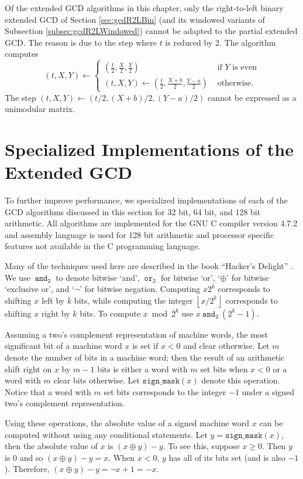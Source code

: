\documentclass{ucalgthes1}
\theoremstyle{definition}
\newcommand{\floor}[1]{\left\lfloor #1 \right\rfloor}
\newcommand{\band}{~\texttt{and}_\texttt{2}~}
\newcommand{\bor}{~\texttt{or}_\texttt{2}~}
\newcommand{\bxor}{\oplus}
\newcommand{\bnot}{\lnot}
\newcommand{\compiler}{GNU C compiler version 4.7.2}
\begin{document}
Of the extended GCD algorithms in this chapter, only the right-to-left binary extended GCD of Section \ref{sec:gcdR2LBin} (and its windowed variants of Subsection \ref{subsec:gcdR2LWindowed}) cannot be adapted to the partial extended GCD.  The reason is due to the step where $t$ is reduced by 2.  The algorithm computes
\[
	(t, X, Y) \gets \begin{cases}
		\left( \frac{t}{2}, \frac{X}{2}, \frac{Y}{2} \right) &
			\textrm{ if $Y$ is even} \\
		(t, X, Y) \gets \left( \frac{t}{2}, \frac{X+b}{2}, \frac{Y-a}{2} \right) & 
			\textrm{ otherwise.}
	\end{cases}
\]
The step $(t, X, Y) \gets (t/2, (X+b)/2, (Y-a)/2)$ cannot be expressed as a unimodular matrix.


\section{Specialized Implementations of the Extended GCD}
\label{sec:gcdImpl}

To further improve performance, we specialized implementations of each of the GCD algorithms discussed in this section for 32 bit, 64 bit, and 128 bit arithmetic.  All algorithms are implemented for the \compiler{} and assembly language is used for 128 bit arithmetic and processor specific features not available in the C programming language.

Many of the techniques used here are described in the book ``Hacker's Delight'' \cite{Warren2002}.  We use $\band$ to denote bitwise `and', $\bor$ for bitwise `or', `$\bxor$' for bitwise `exclusive or', and `$\bnot$' for bitwise negation.  Computing $x2^k$ corresponds to shifting $x$ left by $k$ bits, while computing the integer $\floor{x / 2^k}$ corresponds to shifting $x$ right by $k$ bits.  To compute $x \bmod 2^k$ use $x \band (2^k-1)$.

Assuming a two's complement representation of machine words, the most significant bit of a machine word $x$ is set if $x < 0$ and clear otherwise.  Let $m$ denote the number of bits in a machine word; then the result of an arithmetic shift right on $x$ by $m-1$ bits is either a word with $m$ set bits when $x < 0$ or a word with $m$ clear bits otherwise.  Let $\texttt{sign\_mask}(x)$ denote this operation.  Notice that a word with $m$ set bits corresponds to the integer $-1$ under a signed two's complement representation.

Using these operations, the absolute value of a signed machine word $x$ can be computed without using any conditional statements.  Let $y = \texttt{sign\_mask}(x)$, then the absolute value of $x$ is $(x \bxor y) - y$.  To see this, suppose $x \ge 0$.  Then $y$ is 0 and so $(x \bxor y) - y = x$.  When $x < 0$, $y$ has all of its bits set (and is also $-1$).  Therefore, $(x \bxor y) - y = \bnot x + 1 = -x$.
\end{document}

